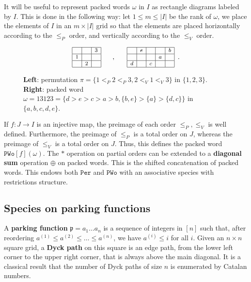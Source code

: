 \documentclass[submission]{FPSAC2023}
\theoremstyle{definition}
\begin{document}
It will be useful to represent packed words $\omega $ in $I$ as rectangle diagrams labeled by $I$.
This is done in the following way: let $1\leq m \leq |I|$ be the rank of $\omega$, we place the elements of $I$ in an $m \times |I|$ grid so that the elements are placed horizontally according to the $\leq_P$ order, and vertically according to the $\leq_V$ order.
\begin{figure}[h]
\[\footnotesize{
\begin{array}{|c|c|c|}
	\hline & & 3 \\
    \hline 1 & &  \\
    \hline & 2 & \\
    \hline 
\end{array} \qquad , \qquad 
\begin{array}{|c|c|c|c|c|}
	\hline   & e &   &   & b \\
    \hline   &   &   & a &   \\
    \hline d &   & c &   &   \\
    \hline 
\end{array}}\, \, \, .\]
\caption{{\bf Left}: permutation $\pi = \{1<_P2<_P3 , 2<_V1<_V3\}$ in $\{1, 2, 3\}$. {\bf Right}: packed word $\omega = 13123 = \{ d > e > c > a > b, \{b, e\} > \{a\} > \{d, c\}\}$ in $\{a, b, c, d, e\}$.}
\end{figure}


If $f:J \to I $ is an injective map, the preimage of each order $\leq_P, \leq_V$ is well defined.
Furthermore, the preimage of $\leq_P$ is a total order on $J$, whereas the preimage of $\leq_V$ is a total order on $J$.
Thus, this defines the packed word $\mathtt{PWo}[f](\omega )$.
The $\ast $ operation on partial orders can be extended to a \textbf{diagonal sum} operation $\oplus $ on packed words.
This is the shifted concatenation of packed words.
This endows both $\mathtt{Per}$ and $\mathtt{PWo}$ with an associative species with restrictions structure.

\subsection{Species on parking functions}

A {\bf parking function} $\mathfrak{p} = a_1 \dots a_n$ is a sequence of integers in $[n]$ such that, after reordering $a^{(1)} \leq a^{(2)} \leq \dots \leq a^{(n)}$, we have $a^{(i)} \leq i$ for all $i$. Given an $n\times n$ square grid, a \textbf{Dyck path} on this square is an edge path, from the lower left corner to the upper right corner, that is always above the main diagonal.
It is a classical result that the number of Dyck paths of size $n$ is enumerated by Catalan numbers.
\end{document}
